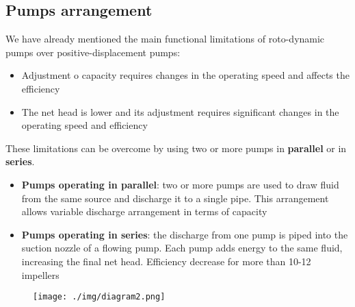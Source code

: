 \subsection{Pumps arrangement}
We have already mentioned the main functional limitations of roto-dynamic pumps over positive-displacement pumps:
\begin{itemize}
  \item Adjustment o capacity requires changes in the operating speed and affects the efficiency
  \item The net head is lower and its adjustment requires significant changes in the operating speed and efficiency
\end{itemize}
These limitations can be overcome by using two or more pumps in \textbf{parallel} or in \textbf{series}.
\begin{itemize}
  \item \textbf{Pumps operating in parallel}: two or more pumps are used to draw fluid from the same source and discharge it to a single pipe. This arrangement allows variable discharge arrangement in terms of capacity
  \item \textbf{Pumps operating in series}: the discharge from one pump is piped into the suction nozzle of a flowing pump. Each pump adds energy to the same fluid, increasing the final net head. Efficiency decrease for more than 10-12 impellers
\end{itemize}
\begin{figure}[H]
  \centering
  \texttt{[image: ./img/diagram2.png]}
\end{figure}
